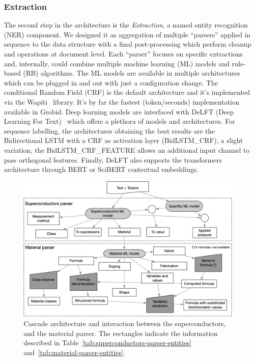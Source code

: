 \documentclass{article}
\begin{document}
\subsubsection{Extraction}
\label{subsubsec:extraction}

The second step in the architecture is the \textit{Extraction}, a named entity recognition (NER) component.
We designed it as aggregation of multiple ``parsers'' applied in sequence to the data structure with a final post-processing which perform cleanup and operations at document level.
Each ``parser'' focuses on specific extractions and, internally, could combine multiple machine learning (ML) models and rule-based (RB) algorithms.
The ML models are available in multiple architectures which can be plugged in and out with just a configuration change. 
The conditional Random Field (CRF) is the default architecture and it's implemented via the Wapiti~\cite{lavergne2010practical} library. It's by far the fastest (token/seconds) implementation available in Grobid. 
Deep learning models are interfaced with DeLFT (Deep Learning For Text)~\cite{DeLFT} which offers a plethora of models and architectures. For sequence labelling, the architectures obtaining the best results are the Bidirectional LSTM with a CRF as activation layer (BidLSTM\_CRF), a slight variation, the BidLSTM\_CRF\_FEATURE allows an additional input channel to pass orthogonal features. Finally, DeLFT also supports the transformers architecture through BERT or SciBERT contextual embeddings. 

\begin{figure}[ht]
\includegraphics[width=\textwidth]{extraction-schema-3}
\caption{\label{fig:extraction-ml-models-cascade-architecture} Cascade architecture and interaction between the superconductors, and the material parser. The rectangles indicate the information described in Table~\ref{tab:superconductors-parser-entities} and~\ref{tab:material-parser-entities}. }
\end{figure}
\end{document}
